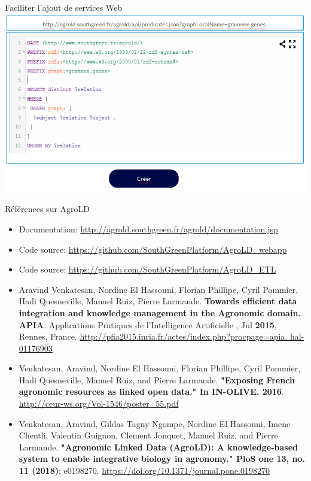 \documentclass[newPxFont,pagenumber]{beamer}
\begin{document}
\begin{frame}{Faciliter l'ajout de services Web} 
\centering \includegraphics[height=0.7\textheight]{create-webservice.png}
\end{frame}

\begin{frame}{Références sur AgroLD}
\begin{itemize} \scriptsize
	\item Documentation: \url{http://agrold.southgreen.fr/agrold/documentation.jsp}
	\item Code source:   \url{https://github.com/SouthGreenPlatform/AgroLD_webapp}
	\item Code source:  \url{https://github.com/SouthGreenPlatform/AgroLD_ETL}
	\item Aravind Venkatesan, Nordine El Hassouni, Florian Phillipe, Cyril Pommier, Hadi Quesneville, Manuel Ruiz, Pierre Larmande. \textbf{Towards efficient data integration and knowledge management in the Agronomic domain. APIA}: Applications Pratiques de l'Intelligence Artificielle , Jul \textbf{2015}, Rennes, France. \url{http://pfia2015.inria.fr/actes/index.php?procpage=apia. hal-01176903}
	\item Venkatesan, Aravind, Nordine El Hassouni, Florian Phillipe, Cyril Pommier, Hadi Quesneville, Manuel Ruiz, and Pierre Larmande. \textbf{"Exposing French agronomic resources as linked open data." In IN-OLIVE. 2016}. \url{http://ceur-ws.org/Vol-1546/poster_55.pdf}
	\item Venkatesan, Aravind, Gildas Tagny Ngompe, Nordine El Hassouni, Imene Chentli, Valentin Guignon, Clement Jonquet, Manuel Ruiz, and Pierre Larmande. \textbf{"Agronomic Linked Data (AgroLD): A knowledge-based system to enable integrative biology in agronomy." PloS one 13, no. 11 (2018)}: e0198270. \url{https://doi.org/10.1371/journal.pone.0198270}	
\end{itemize}


\end{frame}
\end{document}
